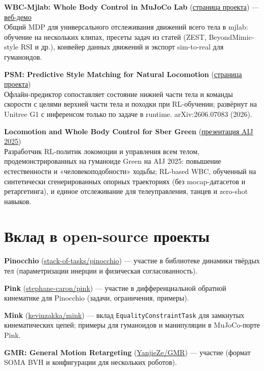 \documentclass[11pt,a4paper]{article}
\begin{document}
\textbf{WBC-Mjlab: Whole Body Control in MuJoCo Lab} (\href{https://wbc-mjlab.github.io/}{страница проекта}) — \href{https://wbc-mjlab.github.io/wbc-demo/}{веб-демо}\\
Общий MDP для универсального отслеживания движений всего тела в mjlab: обучение на нескольких клипах, пресеты задач из статей (ZEST, BeyondMimic-style RSI и др.), конвейер данных движений и экспорт sim-to-real для гуманоидов.

\textbf{PSM: Predictive Style Matching for Natural Locomotion} (\href{https://simeon-ned.github.io/predictive-style-matching/}{страница проекта})\\
Офлайн-предиктор сопоставляет состояние нижней части тела и команды скорости с целями верхней части тела и походки при RL-обучении; развёрнут на Unitree G1 с инференсом только по задаче в runtime. arXiv:2606.07083 (2026).

\textbf{Locomotion and Whole Body Control for Sber Green} (\href{https://youtu.be/eehll8Uw3pw?t=1432}{презентация AIJ 2025})\\
Разработчик RL-политик локомоции и управления всем телом, продемонстрированных на гуманоиде Green на AIJ 2025: повышение естественности и «человекоподобности» ходьбы; RL-based WBC, обученный на синтетически сгенерированных опорных траекториях (без mocap-датасетов и ретаргетинга), и единое отслеживание для телеуправления, танцев и zero-shot навыков.

\section{Вклад в open-source проекты}

\textbf{Pinocchio} (\href{https://github.com/stack-of-tasks/pinocchio}{stack-of-tasks/pinocchio}) — участие в библиотеке динамики твёрдых тел (параметризации инерции и физическая согласованность).

\textbf{Pink} (\href{https://github.com/stephane-caron/pink}{stephane-caron/pink}) — участие в дифференциальной обратной кинематике для Pinocchio (задачи, ограничения, примеры).

\textbf{Mink} (\href{https://github.com/kevinzakka/mink}{kevinzakka/mink}) — вклад \texttt{EqualityConstraintTask} для замкнутых кинематических цепей; примеры для гуманоидов и манипуляции в MuJoCo-порте Pink.

\textbf{GMR: General Motion Retargeting} (\href{https://github.com/YanjieZe/GMR}{YanjieZe/GMR}) — участие (формат SOMA BVH и конфигурации для нескольких роботов).
\end{document}
